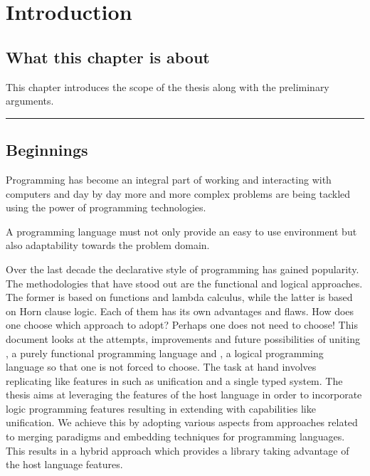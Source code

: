 \documentclass[thesis-solanki.tex]{subfiles}
\begin{document}
\chapter{Introduction}\label{chap:introduction}


\section{What this chapter is about}

This chapter introduces the scope of the thesis along with the preliminary arguments.


\noindent\rule{\textwidth}{0.5pt}


\section{Beginnings}

Programming has become an integral part of working and interacting with computers and day by day more and more
complex problems are being tackled using the power of programming technologies.

A programming language must not only provide an easy to use environment but also adaptability towards the problem
domain. 

Over the last decade the declarative style of programming has gained popularity.
The methodologies that have stood out are the functional and logical approaches.
The former is based on functions and lambda calculus, while the latter is based on Horn clause logic.
Each of them has its own advantages and flaws.
How does one choose which approach to adopt?
Perhaps one does not need to choose!
This document looks at the attempts, improvements and future possibilities of uniting , a purely
functional programming language and , a logical programming language so that one is not forced to
choose. The task at hand involves replicating  like
features in  such as unification and a single typed system.
The thesis aims at leveraging the features of the host language in order to incorporate logic programming features
resulting in extending  with capabilities like unification.
We achieve this by adopting various aspects from approaches related to merging paradigms and embedding techniques
for programming languages.
This results in a hybrid approach which provides a library taking advantage of the host language features.
\end{document}
